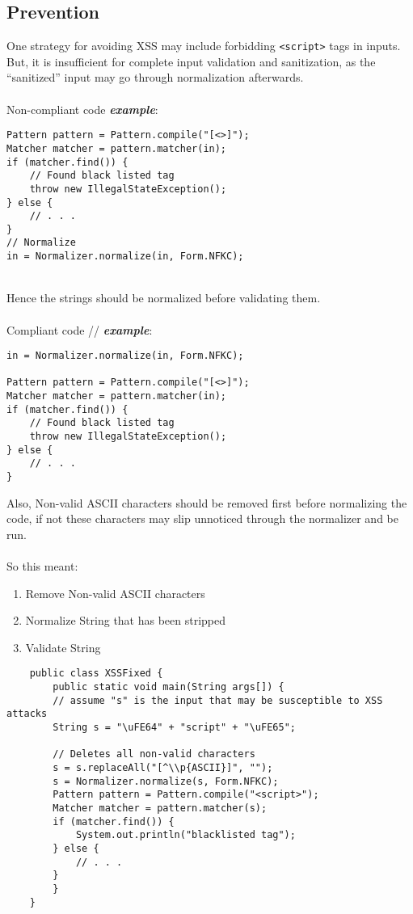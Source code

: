 \documentclass[a4paper]{article}
\begin{document}
\subsection{Prevention}
One strategy for avoiding XSS may include forbidding \texttt{<script>} tags in inputs. But, it is insufficient for complete input validation and sanitization, as the “sanitized” input may go through normalization afterwards.\\
\\
\newpage
Non-compliant code \textbf{\textit{example}}:
\begin{verbatim}
Pattern pattern = Pattern.compile("[<>]"); 
Matcher matcher = pattern.matcher(in);
if (matcher.find()) {
	// Found black listed tag
	throw new IllegalStateException();
} else {
	// . . .
}
// Normalize
in = Normalizer.normalize(in, Form.NFKC);
\end{verbatim}
\mbox{}\\
Hence the strings should be normalized before validating them.\\
\\
Compliant code // \textbf{\textit{example}}:
\begin{verbatim}
in = Normalizer.normalize(in, Form.NFKC);

Pattern pattern = Pattern.compile("[<>]"); 
Matcher matcher = pattern.matcher(in);
if (matcher.find()) {
	// Found black listed tag
	throw new IllegalStateException();
} else {
	// . . .
}
\end{verbatim}
Also, Non-valid ASCII characters should be removed first before normalizing the code, if not these characters may slip unnoticed through the normalizer and be run.\\
\\
So this meant:
\begin{enumerate}
	\item Remove Non-valid ASCII characters
	\item Normalize String that has been stripped
	\item Validate String
\end{enumerate}
\newpage
\begin{verbatim}
	public class XSSFixed {
		public static void main(String args[]) {
		// assume "s" is the input that may be susceptible to XSS attacks
		String s = "\uFE64" + "script" + "\uFE65";
		
		// Deletes all non-valid characters
		s = s.replaceAll("[^\\p{ASCII}]", "");
		s = Normalizer.normalize(s, Form.NFKC);
		Pattern pattern = Pattern.compile("<script>");
		Matcher matcher = pattern.matcher(s);
		if (matcher.find()) {
			System.out.println("blacklisted tag");
		} else {
			// . . .
		}
		}
	}
\end{verbatim}
\end{document}
